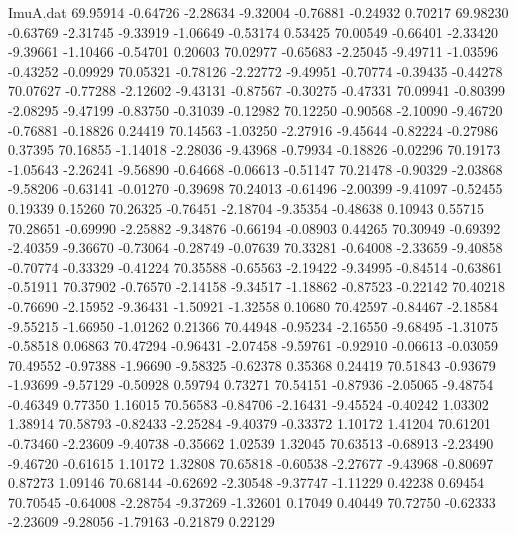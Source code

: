 \begin{filecontents}{ImuA.dat}
  69.95914   -0.64726   -2.28634   -9.32004   -0.76881   -0.24932    0.70217
  69.98230   -0.63769   -2.31745   -9.33919   -1.06649   -0.53174    0.53425
  70.00549   -0.66401   -2.33420   -9.39661   -1.10466   -0.54701    0.20603
  70.02977   -0.65683   -2.25045   -9.49711   -1.03596   -0.43252   -0.09929
  70.05321   -0.78126   -2.22772   -9.49951   -0.70774   -0.39435   -0.44278
  70.07627   -0.77288   -2.12602   -9.43131   -0.87567   -0.30275   -0.47331
  70.09941   -0.80399   -2.08295   -9.47199   -0.83750   -0.31039   -0.12982
  70.12250   -0.90568   -2.10090   -9.46720   -0.76881   -0.18826    0.24419
  70.14563   -1.03250   -2.27916   -9.45644   -0.82224   -0.27986    0.37395
  70.16855   -1.14018   -2.28036   -9.43968   -0.79934   -0.18826   -0.02296
  70.19173   -1.05643   -2.26241   -9.56890   -0.64668   -0.06613   -0.51147
  70.21478   -0.90329   -2.03868   -9.58206   -0.63141   -0.01270   -0.39698
  70.24013   -0.61496   -2.00399   -9.41097   -0.52455    0.19339    0.15260
  70.26325   -0.76451   -2.18704   -9.35354   -0.48638    0.10943    0.55715
  70.28651   -0.69990   -2.25882   -9.34876   -0.66194   -0.08903    0.44265
  70.30949   -0.69392   -2.40359   -9.36670   -0.73064   -0.28749   -0.07639
  70.33281   -0.64008   -2.33659   -9.40858   -0.70774   -0.33329   -0.41224
  70.35588   -0.65563   -2.19422   -9.34995   -0.84514   -0.63861   -0.51911
  70.37902   -0.76570   -2.14158   -9.34517   -1.18862   -0.87523   -0.22142
  70.40218   -0.76690   -2.15952   -9.36431   -1.50921   -1.32558    0.10680
  70.42597   -0.84467   -2.18584   -9.55215   -1.66950   -1.01262    0.21366
  70.44948   -0.95234   -2.16550   -9.68495   -1.31075   -0.58518    0.06863
  70.47294   -0.96431   -2.07458   -9.59761   -0.92910   -0.06613   -0.03059
  70.49552   -0.97388   -1.96690   -9.58325   -0.62378    0.35368    0.24419
  70.51843   -0.93679   -1.93699   -9.57129   -0.50928    0.59794    0.73271
  70.54151   -0.87936   -2.05065   -9.48754   -0.46349    0.77350    1.16015
  70.56583   -0.84706   -2.16431   -9.45524   -0.40242    1.03302    1.38914
  70.58793   -0.82433   -2.25284   -9.40379   -0.33372    1.10172    1.41204
  70.61201   -0.73460   -2.23609   -9.40738   -0.35662    1.02539    1.32045
  70.63513   -0.68913   -2.23490   -9.46720   -0.61615    1.10172    1.32808
  70.65818   -0.60538   -2.27677   -9.43968   -0.80697    0.87273    1.09146
  70.68144   -0.62692   -2.30548   -9.37747   -1.11229    0.42238    0.69454
  70.70545   -0.64008   -2.28754   -9.37269   -1.32601    0.17049    0.40449
  70.72750   -0.62333   -2.23609   -9.28056   -1.79163   -0.21879    0.22129

\end{filecontents}
